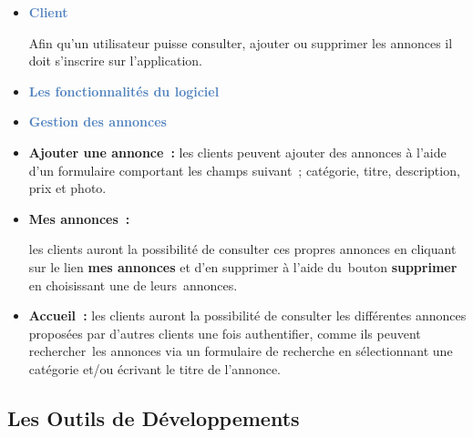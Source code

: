 \documentclass[12pt]{report}
\begin{document}
\begin{enumerate}[label*={\fontsize{12pt}{12pt}\selectfont \textbf{\arabic*.}}]
\begin{enumerate}[label*={\fontsize{16pt}{16pt}\selectfont \textbf{\arabic*.}}]
\vspace{\baselineskip}
\begin{itemize}
	\item \textbf{\textcolor[HTML]{4F81BD}{Client}}\par

\begin{justify}
Afin qu’un utilisateur puisse consulter, ajouter ou supprimer les annonces il doit s’inscrire sur l’application.
\end{justify}\par

	\item {\fontsize{14pt}{16.8pt}\selectfont \textbf{\textcolor[HTML]{4F81BD}{Les fonctionnalités du logiciel }}\par}\par


\vspace{\baselineskip}
	\item {\fontsize{14pt}{16.8pt}\selectfont \textbf{\textcolor[HTML]{4F81BD}{Gestion des annonces}}\par}
\end{itemize}\par

\begin{itemize}
	\item \textbf{Ajouter une annonce : }les clients peuvent ajouter des annonces à l’aide d’un formulaire comportant les champs suivant ; catégorie, titre, description, prix et photo.\par

	\item \textbf{Mes annonces :}{\fontsize{14pt}{16.8pt}\selectfont \textbf{ }les clients auront la possibilité de consulter ces propres annonces en cliquant sur le lien \textbf{mes annonces} et d’en supprimer à l’aide du\ bouton  \textbf{supprimer} en choisissant une de leurs\ annonces.  \par}\par

	\item \textbf{Accueil : }les clients auront la possibilité de consulter les différentes annonces proposées par d’autres clients une fois authentifier, comme ils peuvent rechercher\ les annonces via un formulaire de recherche en sélectionnant une catégorie et/ou écrivant le titre de l’annonce.  \textbf{ }
\end{itemize}\par

\setlength{\parskip}{0.0pt}

\end{enumerate}
\end{enumerate}\subsection{Les Outils de Développements }
\end{document}
